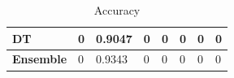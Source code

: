 \documentclass[runningheads]{llncs}
\begin{document}
\begin{table}[h]
\begin{tabular}{|C{2cm}|C{1.5cm}|C{1.5cm}|C{1.5cm}|C{1.5cm}|C{1.5cm}|C{1.5cm}|C{1.5cm}|}
\textbf{DT}                            & 0                                       & 0.9047                                        & 0                                                          & 0                                                            & 0                                                            & 0                                                          & 0                                      \\ \hline
{} 
\textbf{Ensemble}                      & 0                                       & 0.9343                                       & 0                                                          & 0                                                            & 0                                                            & 0                                                          & 0                                      \\ \hline
\end{tabular}
\caption{Accuracy}
\label{Accuracy}
\end{table}
%
%
%
%
%
\end{document}
